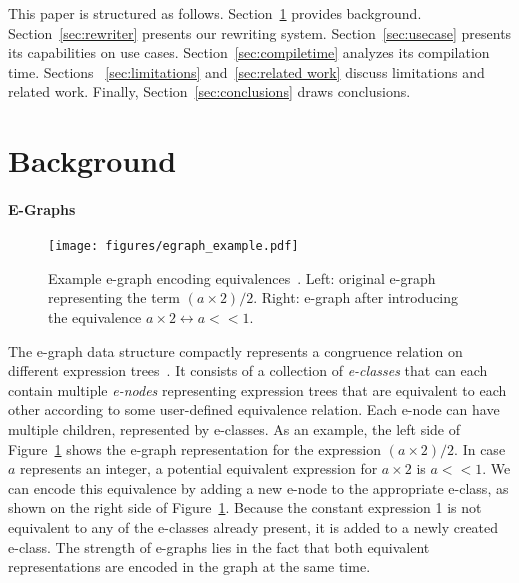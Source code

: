 This paper is structured as follows. Section~\ref{sec:background} provides background. Section~\ref{sec:rewriter} presents our rewriting system. Section~\ref{sec:usecase} presents its capabilities on use cases. Section~\ref{sec:compiletime} analyzes its compilation time. Sections ~\ref{sec:limitations} and~\ref{sec:related work} discuss limitations and related work. Finally, Section~\ref{sec:conclusions} draws conclusions.%

\section{Background}
\label{sec:background}
\paragraph{E-Graphs}
\begin{figure}
    \centering
    \texttt{[image: figures/egraph\_example.pdf]}
    \caption{Example e-graph encoding equivalences~\cite{willseyEggFastExtensible2021}. Left: original e-graph representing the term $(a \times 2) / 2$. Right: e-graph after introducing the equivalence $a \times 2 \leftrightarrow a << 1$.}
    \label{fig:e-graph}
\end{figure}
The e-graph data structure compactly represents a congruence relation on different expression trees~\cite{nelsonTechniquesProgramVerification1979,willseyEggFastExtensible2021}.
It consists of a collection of \emph{e-classes} that can each contain multiple \emph{e-nodes} representing expression trees that are equivalent to each other according to some user-defined equivalence relation.
Each e-node can have multiple children, represented by e-classes.
As an example, the left side of Figure~\ref{fig:e-graph} shows the e-graph representation for the expression $(a \times 2) / 2$.
In case $a$ represents an integer, a potential equivalent expression for $a \times 2$ is $a << 1$.
We can encode this equivalence by adding a new e-node to the appropriate e-class, as shown on the right side of Figure~\ref{fig:e-graph}. Because the constant expression 1 is not equivalent to any of the e-classes already present, it is added to a newly created e-class.
The strength of e-graphs lies in the fact that both equivalent representations are encoded in the graph at the same time.
